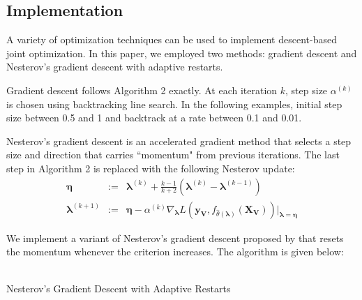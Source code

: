\documentclass[10pt,letterpaper]{article}
\begin{document}
\subsection{Implementation}
A variety of optimization techniques can be used to implement descent-based joint optimization. In this paper, we employed two methods: gradient descent and Nesterov's gradient descent with adaptive restarts.

Gradient descent follows Algorithm 2 exactly. At each iteration $k$, step size $\alpha^{(k)}$ is chosen using backtracking line search. In the following examples, initial step size between 0.5 and 1 and backtrack at a rate between 0.1 and 0.01.

Nesterov's gradient descent is an accelerated gradient method that selects a step size and direction that carries ``momentum" from previous iterations. The last step in Algorithm 2 is replaced with the following Nesterov update:
\begin{equation}
\begin{array}{lcl}
\boldsymbol{\eta} & := &
 \boldsymbol{\lambda}^{(k)} + \frac{k - 1}{k+2} \left( \boldsymbol{\lambda}^{(k)} - \boldsymbol{\lambda}^{(k-1)} \right ) \\
\boldsymbol{\lambda}^{(k+1)} & := &
\boldsymbol{\eta}
- \alpha^{(k)} \nabla_{\boldsymbol{\lambda}} L(\boldsymbol{y_V}, f_{\hat \theta(\boldsymbol{\lambda})}(\boldsymbol{X_V})) |_{\boldsymbol{\lambda} = \boldsymbol{\eta}} 
\end{array}
\label{nesterovUpdates}
\end{equation}

We implement a variant of Nesterov's gradient descent proposed by \citet{o2013adaptive} that resets the momentum whenever the criterion increases. The algorithm is given below:
\begin{center}
  \\
  Nesterov's Gradient Descent with Adaptive Restarts
\end{center}
\end{document}
